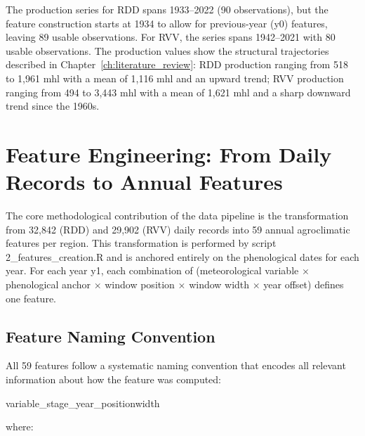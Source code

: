 The production series for RDD spans 1933--2022 (90 observations), but the feature construction starts at 1934 to allow for previous-year (y0) features, leaving 89 usable observations. For RVV, the series spans 1942--2021 with 80 usable observations. The production values show the structural trajectories described in Chapter~\ref{ch:literature_review}: RDD production ranging from 518 to 1,961 mhl with a mean of 1,116 mhl and an upward trend; RVV production ranging from 494 to 3,443 mhl with a mean of 1,621 mhl and a sharp downward trend since the 1960s.


\section{Feature Engineering: From Daily Records to Annual Features}\label{sec:feature_engineering_from_daily}

The core methodological contribution of the data pipeline is the transformation from 32,842 (RDD) and 29,902 (RVV) daily records into 59 annual agroclimatic features per region. This transformation is performed by script 2\_features\_creation.R and is anchored entirely on the phenological dates for each year. For each year y1, each combination of (meteorological variable $\times$ phenological anchor $\times$ window position $\times$ window width $\times$ year offset) defines one feature.


\subsection{Feature Naming Convention}\label{sub:feature_naming_convention}

All 59 features follow a systematic naming convention that encodes all relevant information about how the feature was computed:

{variable}\_{stage}\_{year}\_{position}{width}

where:

